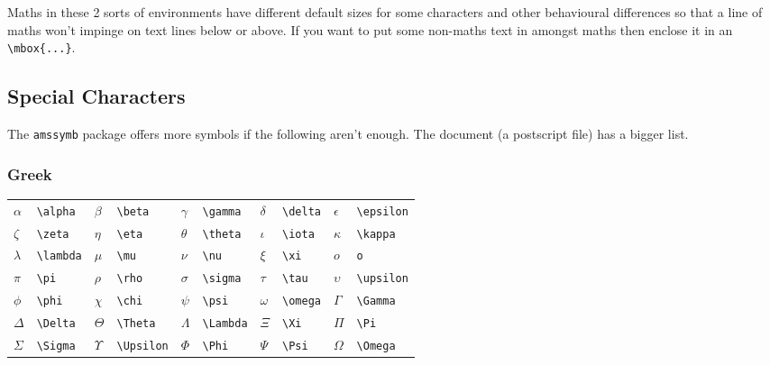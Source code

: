 \documentclass[dvips]{article}
\begin{document}
Maths in these 2 sorts of environments have different default
sizes for some characters and other behavioural differences so 
that a line of maths won't impinge on text lines below or above. 
If you want to put some non-maths text in amongst maths then
enclose it in an \verb|\mbox{...}|.

\subsection{Special Characters}
The \texttt{amssymb} package offers more symbols if the following
aren't enough. The  document (a postscript file) has a bigger list.

\subsubsection{Greek}
\begin{longtable}{llllllllll}
$\alpha$&           \verb|\alpha|&               
$\beta$&           \verb|\beta|&               
$\gamma$&           \verb|\gamma|&               
$\delta$&           \verb|\delta|&               
$\epsilon$&      \verb|\epsilon|\\ 
$\zeta$&     	 \verb|\zeta|&  
$\eta$&      	 \verb|\eta|&      
$\theta$&    	 \verb|\theta|&    
$\iota$&     	 \verb|\iota|&     
$\kappa$&    	 \verb|\kappa|\\    
$\lambda$&    	 \verb|\lambda|&    
$\mu$&       	 \verb|\mu|&    
$\nu$&       	 \verb|\nu|&       
$\xi$&       	 \verb|\xi|&       
$o$&         	 \verb|o|\\         
$\pi$&       	 \verb|\pi|&       
$\rho$&      	 \verb|\rho|&      
$\sigma$&    	 \verb|\sigma|&    
$\tau$&      	 \verb|\tau|&      
$\upsilon$&  	 \verb|\upsilon|\\  
$\phi$&      	 \verb|\phi|&  
$\chi$&      	 \verb|\chi|&      
$\psi$&       	 \verb|\psi|&      
$\omega$&           \verb|\omega|&
$\Gamma$&           \verb|\Gamma|\\
$\Delta$&           \verb|\Delta|&
$\Theta$&           \verb|\Theta|&
$\Lambda$&          \verb|\Lambda|& 
$\Xi$&              \verb|\Xi| &
$\Pi$&              \verb|\Pi|\\
$\Sigma$&           \verb|\Sigma|&
$\Upsilon$&         \verb|\Upsilon|&
$\Phi$&             \verb|\Phi|&
$\Psi$&             \verb|\Psi| &      
$\Omega$&           \verb|\Omega|\\               
\end{longtable}
\end{document}
